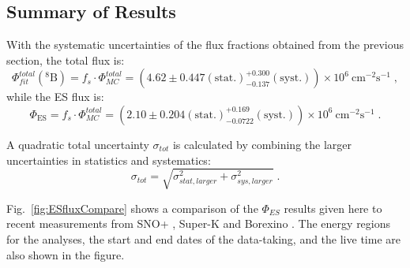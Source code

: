\subsection{Summary of Results}\label{sect:solarESresults}

With the systematic uncertainties of the flux fractions obtained from the previous section, the total flux is:
\begin{equation}
{\Phi^{total}_{fit}(\mathrm{^8 B})=f_s\cdot \Phi^{total}_{MC}=(4.62\pm 0.447\mathrm{(stat.)}^{+0.300}_{-0.137}\mathrm{(syst.)})\times 10^6~\mathrm{cm^{-2}s^{-1}}}\; ,
\end{equation}
while the ES flux is:
\begin{equation}
\Phi_{\mathrm{ES}}=f_s\cdot \Phi^{total}_{MC}=(2.10\pm 0.204\mathrm{(stat.)}^{+0.169}_{-0.0722}\mathrm{(syst.)})\times 10^6~\mathrm{cm^{-2}s^{-1}}\; .
\end{equation}

A quadratic total uncertainty $\sigma_{tot}$ is calculated by combining the larger uncertainties in statistics and systematics:
\begin{equation}
\sigma_{tot}=\sqrt{\sigma^2_{stat,larger}+\sigma^2_{sys,larger}}\; .
\end{equation}

Fig.~\ref{fig:ESfluxCompare} shows a comparison of the $\Phi_{ES}$ results given here to recent measurements from SNO+ \cite{anderson2019measurement}, Super-K \cite{abe2016solar} and Borexino \cite{agostini2020improved}. The energy regions for the analyses, the start and end dates of the data-taking, and the live time are also shown in the figure.
 
